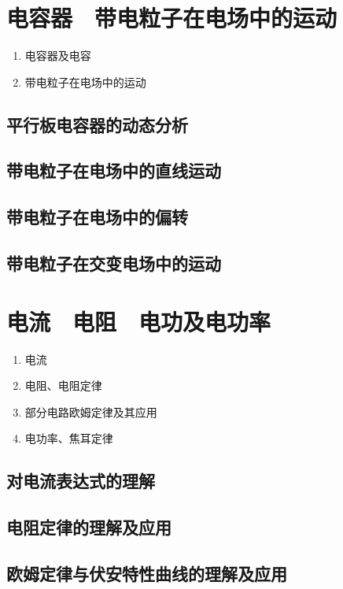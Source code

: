 \documentclass[cn,11pt, simple]{elegantbook}
\begin{document}
\chapter{电容器　带电粒子在电场中的运动}
\begin{enumerate}
   \item 电容器及电容
   \item 带电粒子在电场中的运动
\end{enumerate}

\clearpage\section{平行板电容器的动态分析}

\clearpage\section{带电粒子在电场中的直线运动}

\clearpage\section{带电粒子在电场中的偏转}

\clearpage\section{带电粒子在交变电场中的运动}
\chapter{电流　电阻　电功及电功率}
\begin{enumerate}
   \item 电流
   \item 电阻、电阻定律
   \item 部分电路欧姆定律及其应用
   \item 电功率、焦耳定律
\end{enumerate}

\clearpage\section{对电流表达式的理解}

\clearpage\section{电阻定律的理解及应用}

\clearpage\section{欧姆定律与伏安特性曲线的理解及应用}
\end{document}
